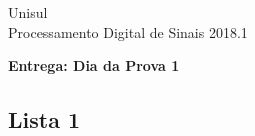 \documentclass[]{book}
\theoremstyle{definition}
\begin{document}
\begin{center}
\Large Unisul\\
\Large Processamento Digital de Sinais \hspace{0.5cm} 2018.1\\
\end{center}

\textbf{\Large Entrega: Dia da Prova 1} %

\vspace{0.2 cm}


\subsection*{Lista 1}
\end{document}

